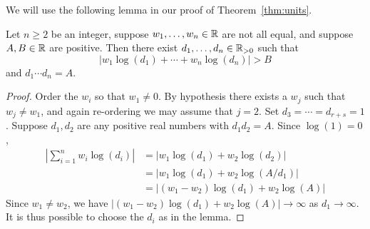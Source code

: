 We will use the following lemma in our
proof of Theorem~\ref{thm:units}.
\begin{lemma}\label{lem:chooseci}
	Let $n\geq 2$ be an integer, suppose $w_1,\ldots, w_n\in\mathbb{R}$
	are not all equal, and suppose $A, B\in\mathbb{R}$ are positive. Then
	there exist $d_1,\ldots, d_{n} \in \mathbb{R}_{>0}$ such that
	$$
		\left|w_1\log(d_1)+\cdots +w_{n}\log(d_{n})\right| > B
	$$
	and $d_1\cdots d_n = A$.
\end{lemma}
\begin{proof}
	Order the $w_i$ so
	that $w_1\neq 0$.  By hypothesis there exists a $w_j$ such that
	$w_j\neq w_1$, and again re-ordering we may assume that $j=2$.  Set
	$d_3=\cdots=d_{r+s}=1$.  Suppose $d_1, d_2$ are any positive real numbers
	with  $d_1 d_2 = A$.  Since $\log(1)=0$,
	\begin{align*}
		\left|\sum_{i=1}^{n} w_i \log(d_i)\right|
		&= |w_1\log(d_1) + w_2\log(d_2)|\\
		&= |w_1 \log(d_1) + w_2\log(A/d_1)| \\
		&= |(w_1-w_2)\log(d_1) + w_2\log(A)|
	\end{align*}
	Since $w_1\neq w_2$,  we have $|(w_1-w_2)\log(d_1) + w_2\log(A)|\to\infty$
	as $d_1\to \infty$.  It is thus possible to choose the $d_i$ as in the lemma.
\end{proof}

